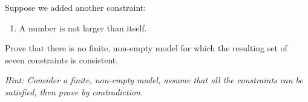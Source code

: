 \item {}
Suppose we added another constraint:
\begin{enumerate}[label=\arabic*., start=7]
  \item A number is not larger than itself.
\end{enumerate}

Prove that there is no finite, non-empty model for which the resulting set of
seven constraints is consistent.

{\em Hint: Consider a finite, non-empty model, assume that all the constraints
can be satisfied, then prove by contradiction.}
